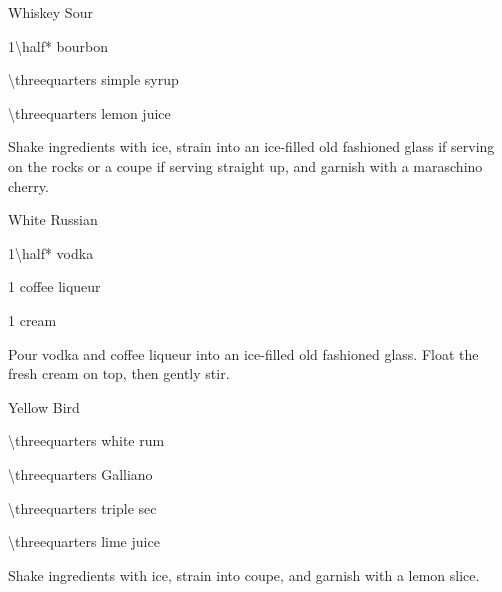 \begin{Cocktail}{Whiskey Sour}
	\begin{Ingredients}
	\item \SI{1\half*}{\oz} bourbon
	\item \SI{\threequarters}{\oz} simple syrup
	\item \SI{\threequarters}{\oz} lemon juice
	\end{Ingredients}
	
	\begin{Instructions}
	Shake ingredients with ice, strain into an ice-filled old fashioned glass if serving on the rocks or a coupe if serving straight up, and garnish with a maraschino cherry.	
	\end{Instructions}
\end{Cocktail}

\begin{Cocktail}{White Russian}
	\begin{Ingredients}
	\item \SI{1\half*}{\oz} vodka
	\item \SI{1}{\oz} coffee liqueur
	\item \SI{1}{\oz} cream
	\end{Ingredients}
	
	\begin{Instructions}
	Pour vodka and coffee liqueur into an ice-filled old fashioned glass.  Float the fresh cream on top, then gently stir.
	\end{Instructions}
\end{Cocktail}

\begin{Cocktail}{Yellow Bird}
	\begin{Ingredients}
	\item \SI{\threequarters}{\oz} white rum
	\item \SI{\threequarters}{\oz} Galliano
	\item \SI{\threequarters}{\oz} triple sec
	\item \SI{\threequarters}{\oz} lime juice
	\end{Ingredients}
	
	\begin{Instructions}
	Shake ingredients with ice, strain into coupe, and garnish with a lemon slice.
	\end{Instructions}
\end{Cocktail}